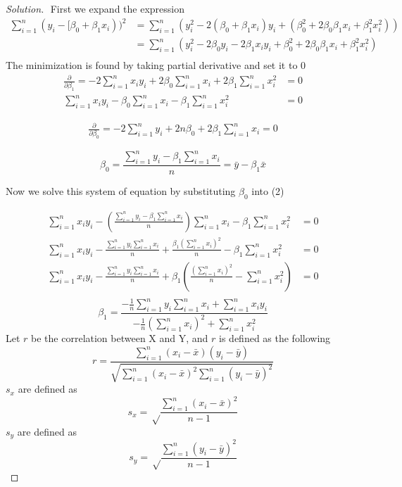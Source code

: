\documentclass{article}
\newenvironment{solution}
  {\renewcommand\qedsymbol{$\blacksquare$}\begin{proof}[Solution]$ $}
  {\end{proof}}
\begin{document}
\newpage
\begin{Exercise}
    \begin{solution}
        First we expand the expression
        \begin{align*}
            \sum_{i=1}^{n}(y_i - [\beta_0 + \beta_1 x_i))^2
             & = \sum_{i=1}^{n}(y_i^2 - 2(\beta_0 + \beta_1 x_i)y_i + (\beta_0^2 + 2 \beta_0 \beta_1 x_i + \beta_1^2 x_i^2))    \\
             & = \sum_{i=1}^{n}(y_i^2 - 2\beta_0 y_i - 2 \beta_1 x_i y_i + \beta_0^2 + 2 \beta_0 \beta_1 x_i + \beta_1^2 x_i^2) \\
        \end{align*}
        The minimization is found by taking partial derivative and set it to 0
        \begin{align}
            \frac{\partial}{\partial \beta_1}
            = -2\sum_{i=1}^{n} x_i y_i + 2\beta_0 \sum_{i=1}^{n} x_i + 2\beta_1 \sum_{i=1}^{n} x_i^2 & = 0 \\
            \sum_{i=1}^{n} x_i y_i - \beta_0 \sum_{i=1}^{n} x_i - \beta_1 \sum_{i=1}^{n} x_i^2       & = 0
        \end{align}

        \begin{align*}
            \frac{\partial}{\partial \beta_0}
            = -2 \sum_{i=1}^{n} y_i + 2n\beta_0  + 2\beta_1 \sum_{i=1}^{n} x_i = 0
        \end{align*}

        \[\beta_0 = \frac{\sum_{i=1}^{n} y_i - \beta_1 \sum_{i=1}^{n} x_i}{n} = \bar y - \beta_1 \bar x\]

        Now we solve this system of equation by substituting \(\beta_0\) into (2)

        \begin{align*}
            \sum_{i=1}^{n} x_i y_i - (\frac{\sum_{i=1}^{n} y_i - \beta_1 \sum_{i=1}^{n} x_i}{n}) \sum_{i=1}^{n} x_i - \beta_1 \sum_{i=1}^{n} x_i^2              & = 0 \\
            \sum_{i=1}^{n} x_i y_i - \frac{\sum_{i=1}^{n} y_i \sum_{i=1}^{n} x_i}{n} + \frac{\beta_1 (\sum_{i=1}^{n} x_i)^2}{n}  - \beta_1 \sum_{i=1}^{n} x_i^2 & = 0 \\
            \sum_{i=1}^{n} x_i y_i - \frac{\sum_{i=1}^{n} y_i \sum_{i=1}^{n} x_i}{n} + \beta_1(\frac{(\sum_{i=1}^{n} x_i)^2}{n}  - \sum_{i=1}^{n} x_i^2)        & = 0 \\
        \end{align*}
        \[\beta_1 = \frac{-\frac{1}{n} \sum_{i=1}^{n} y_i  \sum_{i=1}^{n} x_i + \sum_{i=1}^{n}  x_i y_i}{-\frac{1}{n}(\sum_{i=1}^{n} x_i)^2 + \sum_{i=1}^{n} x_i^2}\]
        Let \(r\) be the correlation between X and Y, and \(r\) is defined as the following \cite{wackerly}
        \[r = \frac{\sum_{i=1}^n (x_i - \bar x)(y_i-\bar y)}{\sqrt{\sum_{i=1}^{n} (x_i-\bar x)^2 \sum_{i=1}^{n} (y_i - \bar y)^2}}\]
        \(s_x\) are defined as\[s_x = \sqrt\frac{\sum_{i=1}^{n}  (x_i-\bar x)^2}{n-1}\]
        \(s_y\) are defined as\[s_y = \sqrt\frac{\sum_{i=1}^{n}  (y_i-\bar y)^2}{n-1}\]


\end{solution}
\end{Exercise}
\end{document}
